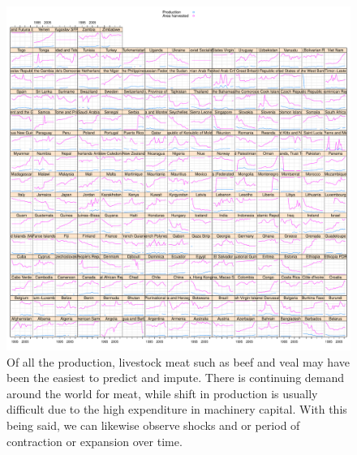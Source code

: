 \documentclass[nojss]{jss}\usepackage[]{graphicx}\usepackage[]{color}
\makeatletter
\def\maxwidth{ %
  \ifdim\Gin@nat@width>\linewidth
    \linewidth
  \else
    \Gin@nat@width
  \fi
}
\newenvironment{knitrout}{}{} %
\makeatother
\begin{document}
\begin{knitrout}
\color{fgcolor}\begin{figure}[!ht]


{\centering \includegraphics[width=\maxwidth]{figure/beef-production-area-explore} 

}

\caption[Of all the production, livestock meat such as beef and veal may have been the easiest to predict and impute]{Of all the production, livestock meat such as beef and veal may have been the easiest to predict and impute. There is continuing demand around the world for meat, while shift in production is usually difficult due to the high expenditure in machinery capital. With this being said, we can likewise observe shocks and or period of contraction or expansion over time.\label{fig:beef-production-area-explore}}
\end{figure}


\end{knitrout}


\end{document}
